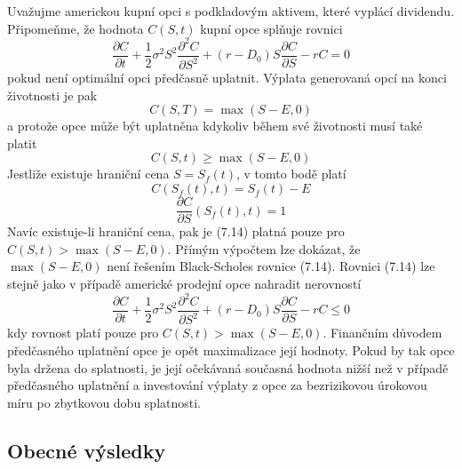 \documentclass[a4paper]{book}
\begin{document}
Uvažujme americkou kupní opci s podkladovým aktivem, které vyplácí dividendu. Připomeňme, že hodnota $C(S,t)$ kupní opce splňuje rovnici
\begin{equation}
\frac{\partial C}{\partial t} + \frac{1}{2}\sigma^2 S^2 \frac{\partial^2 C}{\partial S^2} + (r - D_0)S\frac{\partial C}{\partial S} - rC = 0
\end{equation}
pokud není optimální opci předčasně uplatnit. Výplata generovaná opcí na konci životnosti je pak
\begin{equation}
C(S,T) = \max(S - E, 0)
\end{equation}
a protože opce může být uplatněna kdykoliv během své životnosti musí také platit
\begin{equation}
C(S,t) \ge \max(S - E, 0)
\end{equation}
Jestliže existuje hraniční cena $S = S_f(t)$, v tomto bodě platí
\begin{equation}
C(S_f(t),t) = S_f(t) - E
\end{equation}
\begin{equation}
\frac{\partial C}{\partial S}(S_f(t),t) = 1
\end{equation}
Navíc existuje-li hraniční cena, pak je (7.14) platná pouze pro $C(S, t) > \max(S - E, 0)$. Přímým výpočtem lze dokázat, že $\max(S - E, 0)$ není řešením Black-Scholes rovnice (7.14). Rovnici (7.14) lze stejně jako v případě americké prodejní opce nahradit nerovností
\begin{equation*}
\frac{\partial C}{\partial t} + \frac{1}{2}\sigma^2 S^2 \frac{\partial^2 C}{\partial S^2} + (r - D_0)S\frac{\partial C}{\partial S} - rC \le 0
\end{equation*}
kdy rovnost platí pouze pro $C(S,t) > \max(S - E, 0)$. Finančním důvodem předčasného uplatnění opce je opět maximalizace její hodnoty. Pokud by tak opce byla držena do splatnosti, je její očekávaná současná hodnota nižší než v případě předčasného uplatnění a investování výplaty z opce za bezrizikovou úrokovou míru po zbytkovou dobu splatnosti.

\subsection{Obecné výsledky}
\end{document}
